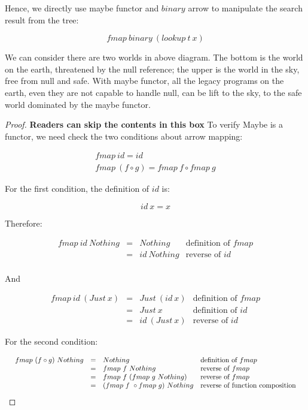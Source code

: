 \documentclass{article}
\begin{document}
\begin{example}
Hence, we directly use maybe functor and $binary$ arrow to manipulate the search result from the tree:

\[
fmap\ binary\ (lookup\ t\ x)
\]

We can consider there are two worlds in above diagram. The bottom is the world on the earth, threatened by the null reference; the upper is the world in the sky, free from null and safe. With maybe functor, all the legacy programs on the earth, even they are not capable to handle null, can be lift to the sky, to the safe world dominated by the maybe functor.

\begin{mdframed}
\begin{proof}
\textbf{Readers can skip the contents in this box} To verify Maybe is a functor, we need check the two conditions about arrow mapping:

\[
\begin{array}{l}
fmap\ id = id \\
fmap\ (f \circ g) = fmap\ f \circ fmap\ g
\end{array}
\]

For the first condition, the definition of $id$ is:

\[
id\ x = x
\]

Therefore:

\[
\begin{array}{rcll}
fmap\ id\ Nothing & = & Nothing & \text{definition of $fmap$} \\
                  & = & id\ Nothing & \text{reverse of $id$} \\
\end{array}
\]

And

\[
\begin{array}{rcll}
fmap\ id\ (Just\ x) & = & Just\ (id\ x) & \text{definition of $fmap$} \\
                    & = & Just\ x & \text{definition of $id$} \\
                    & = & id\ (Just\ x) & \text{reverse of $id$}
\end{array}
\]

For the second condition:

\[
\resizebox{\textwidth}{!}{\ensuremath{
\begin{array}{rcll}
fmap\ (f \circ g)\ Nothing & = & Nothing & \text{definition of $fmap$} \\
           & = & fmap\ f\ Nothing & \text{reverse of $fmap$} \\
           & = & fmap\ f\ (fmap\ g\ Nothing) & \text{reverse of $fmap$} \\
           & = & (fmap\ f\ \circ fmap\ g)\ Nothing & \text{reverse of function composition}
\end{array}
}}
\]


\end{proof}
\end{mdframed}
\end{example}
\end{document}
